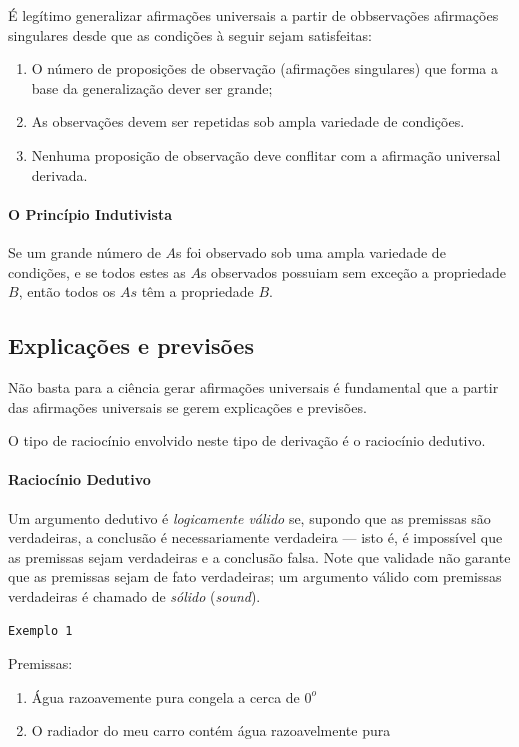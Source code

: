 \documentclass[9pt,a4paper]{extarticle}
\newcommand{\ntc}[1]{\textcolor{notice}{#1}}
\begin{document}
É legítimo generalizar afirmações universais a partir de obbservações afirmações singulares desde que as condições à seguir sejam satisfeitas:

\begin{enumerate}
    \item O número de proposições de observação (afirmações singulares) que forma a base da generalização dever ser grande;
    \item As observações devem ser repetidas sob ampla variedade de condições. 
    \item Nenhuma proposição de observação deve conflitar com a afirmação universal derivada.
\end{enumerate}

\paragraph{O Princípio Indutivista}

Se um grande número de $A$s foi observado sob uma ampla variedade de condições, e se todos estes as $A$s observados possuiam sem exceção a propriedade $B$, então todos os $As$ têm a propriedade $B$. 

\subsection{Explicações e previsões}

Não basta para a ciência gerar afirmações universais é fundamental que a partir das afirmações universais se gerem explicações e previsões.

O tipo de raciocínio envolvido neste tipo de derivação é o \ntc{raciocínio dedutivo}. 

\paragraph{Raciocínio Dedutivo}

Um argumento dedutivo é \textit{logicamente válido} se, supondo que as premissas  são verdadeiras, a conclusão é necessariamente verdadeira --- isto é, é impossível que as premissas sejam verdadeiras e a conclusão falsa. Note que validade não 
garante que as premissas sejam de fato verdadeiras; um argumento válido com premissas verdadeiras é chamado de \textit{sólido} (\textit{sound}).

\texttt{Exemplo 1}

Premissas: 
\begin{enumerate}
    \item Água razoavemente pura congela a cerca de $0^o$
    \item O radiador do meu carro contém água razoavelmente pura 
\end{enumerate}
\end{document}
